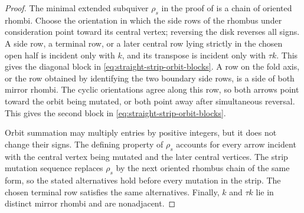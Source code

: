 \documentclass[11pt]{amsart}
\theoremstyle{definition}
\theoremstyle{remark}
\begin{document}
\begin{proof}
The minimal extended subquiver $\rho_s$ in the proof of
\cite[Lemma~6.15]{FeiKroneckerII} is a chain of oriented rhombi.  Choose the
orientation in which the side rows of the rhombus under consideration point
toward its central vertex; reversing the disk reverses all signs.  A side row,
a terminal row, or a later central row lying strictly in the chosen open
half is incident only with $k$, and its transpose is incident only with
$\tau k$.  This gives the diagonal block in
\eqref{eq:straight-strip-orbit-blocks}.  A row on the fold axis, or the row
obtained by identifying the two boundary side rows, is a side of both mirror
rhombi.  The cyclic orientations agree along this row, so both arrows point
toward the orbit being mutated, or both point away after simultaneous
reversal.
This gives the second block in \eqref{eq:straight-strip-orbit-blocks}.

Orbit summation may multiply entries by positive integers, but it does not
change their signs.  The defining property of $\rho_s$ accounts for every
arrow incident with the central vertex being mutated and the later central
vertices.  The strip mutation sequence replaces $\rho_s$ by the next
oriented rhombus chain of the same form, so
the stated alternatives hold before every mutation in the strip.  The
chosen terminal row satisfies the same alternatives.  Finally, $k$ and
$\tau k$ lie in distinct mirror rhombi and are nonadjacent.
\end{proof}
\end{document}
